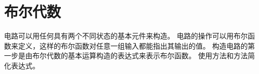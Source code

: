 
\chapter{布尔代数}
{
    电路可以用任何具有两个不同状态的基本元件来构造。
    电路的操作可以用布尔函数来定义，这样的布尔函数对任意一组输入都能指出其输出的值。
    构造电路的第一步是由布尔代数的基本运算构造的表达式来表示布尔函数。
    使用方法和方法简化表达式。

    
    
}

\cleardoublepage

\endinput
